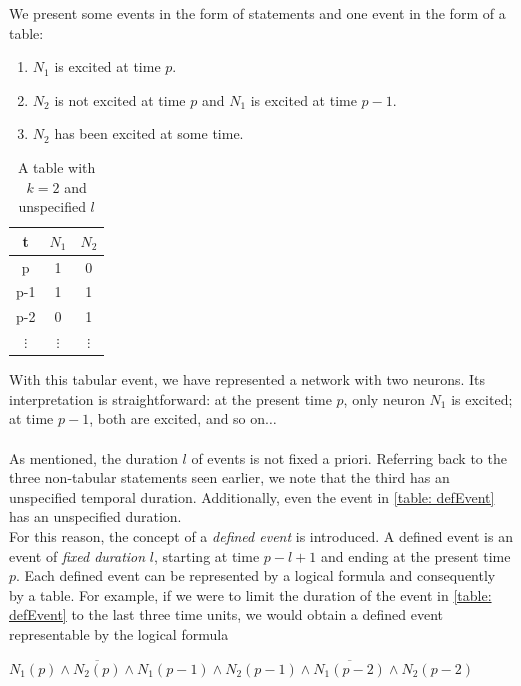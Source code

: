 \documentclass[10pt]{article}
\begin{document}
We present some events in the form of statements and one event in the form of a table:
\begin{enumerate}
	\item $N_1$ is excited at time $p$.
	\item $N_2$ is not excited at time $p$ and $N_1$ is excited at time $p-1$.
	\item $N_2$ has been excited at some time.
\end{enumerate}


\begin{table}[!h]
	\begin{center}
		\begin{tabular}{c|c|c}
			t & \( N_1 \) & \( N_2 \) \\
			\hline
			p & 1 & 0 \\
			p-1 & 1 & 1 \\
			p-2 & 0 & 1 \\
			\(\vdots\) & \(\vdots\) & \(\vdots\) \\
		\end{tabular}
	\end{center}
	\caption{A table with \( k=2 \) and unspecified \( l \)}
	\label{table: defEvent}
\end{table}

With this tabular event, we have represented a network with two neurons. Its interpretation is straightforward: at the present time $p$, only neuron $N_1$ is excited; at time $p-1$, both are excited, and so on$\ldots$\\
\\
As mentioned, the duration $l$ of events is not fixed a priori. Referring back to the three non-tabular statements seen earlier, we note that the third has an unspecified temporal duration. Additionally, even the event in \autoref{table: defEvent} has an unspecified duration.\\
For this reason, the concept of a \emph{defined event} is introduced. A defined event is an event of \emph{fixed duration} $l$, starting at time $p-l+1$ and ending at the present time $p$. Each defined event can be represented by a logical formula and consequently by a table. For example, if we were to limit the duration of the event in \autoref{table: defEvent} to the last three time units, we would obtain a defined event representable by the logical formula




\begin{center}
	$N_1(p) \wedge \overline{N_2(p)} \wedge N_1(p-1) \wedge N_2(p-1) \wedge \overline{N_1(p-2)} \wedge N_2(p-2)$
\end{center}
\end{document}
